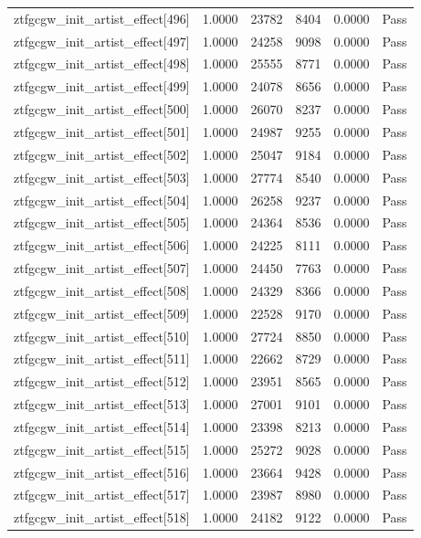 \begin{table}[htbp]
\begin{tabular}{llrrll}
ztfgcgw\_init\_artist\_effect[496] & 1.0000 & 23782 & 8404 & 0.0000 & Pass \\
ztfgcgw\_init\_artist\_effect[497] & 1.0000 & 24258 & 9098 & 0.0000 & Pass \\
ztfgcgw\_init\_artist\_effect[498] & 1.0000 & 25555 & 8771 & 0.0000 & Pass \\
ztfgcgw\_init\_artist\_effect[499] & 1.0000 & 24078 & 8656 & 0.0000 & Pass \\
ztfgcgw\_init\_artist\_effect[500] & 1.0000 & 26070 & 8237 & 0.0000 & Pass \\
ztfgcgw\_init\_artist\_effect[501] & 1.0000 & 24987 & 9255 & 0.0000 & Pass \\
ztfgcgw\_init\_artist\_effect[502] & 1.0000 & 25047 & 9184 & 0.0000 & Pass \\
ztfgcgw\_init\_artist\_effect[503] & 1.0000 & 27774 & 8540 & 0.0000 & Pass \\
ztfgcgw\_init\_artist\_effect[504] & 1.0000 & 26258 & 9237 & 0.0000 & Pass \\
ztfgcgw\_init\_artist\_effect[505] & 1.0000 & 24364 & 8536 & 0.0000 & Pass \\
ztfgcgw\_init\_artist\_effect[506] & 1.0000 & 24225 & 8111 & 0.0000 & Pass \\
ztfgcgw\_init\_artist\_effect[507] & 1.0000 & 24450 & 7763 & 0.0000 & Pass \\
ztfgcgw\_init\_artist\_effect[508] & 1.0000 & 24329 & 8366 & 0.0000 & Pass \\
ztfgcgw\_init\_artist\_effect[509] & 1.0000 & 22528 & 9170 & 0.0000 & Pass \\
ztfgcgw\_init\_artist\_effect[510] & 1.0000 & 27724 & 8850 & 0.0000 & Pass \\
ztfgcgw\_init\_artist\_effect[511] & 1.0000 & 22662 & 8729 & 0.0000 & Pass \\
ztfgcgw\_init\_artist\_effect[512] & 1.0000 & 23951 & 8565 & 0.0000 & Pass \\
ztfgcgw\_init\_artist\_effect[513] & 1.0000 & 27001 & 9101 & 0.0000 & Pass \\
ztfgcgw\_init\_artist\_effect[514] & 1.0000 & 23398 & 8213 & 0.0000 & Pass \\
ztfgcgw\_init\_artist\_effect[515] & 1.0000 & 25272 & 9028 & 0.0000 & Pass \\
ztfgcgw\_init\_artist\_effect[516] & 1.0000 & 23664 & 9428 & 0.0000 & Pass \\
ztfgcgw\_init\_artist\_effect[517] & 1.0000 & 23987 & 8980 & 0.0000 & Pass \\
ztfgcgw\_init\_artist\_effect[518] & 1.0000 & 24182 & 9122 & 0.0000 & Pass \\

\end{tabular}
\end{table}

